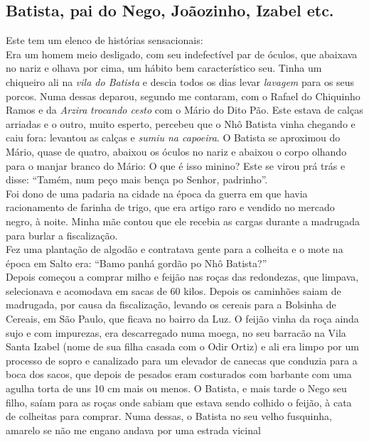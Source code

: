 \documentclass[12pt,brazil,]{book}
\begin{document}
\subsection{Batista, pai do Nego, Joãozinho, Izabel
etc.}\label{batista-pai-do-nego-jouxe3ozinho-izabel-etc.}

Este tem um elenco de histórias sensacionais:\\
Era um homem meio desligado, com seu indefectível par de óculos, que
abaixava no nariz e olhava por cima, um hábito bem característico seu.
Tinha um chiqueiro ali na \emph{vila do Batista} e descia todos os dias
levar \emph{lavagem} para os seus porcos. Numa dessas deparou, segundo
me contaram, com o Rafael do Chiquinho Ramos e da \emph{Arzira}
\emph{trocando cesto} com o Mário do Dito Pão. Este estava de calças
arriadas e o outro, muito esperto, percebeu que o Nhô Batista vinha
chegando e caiu fora: levantou as calças e \emph{sumiu na capoeira}. O
Batista se aproximou do Mário, quase de quatro, abaixou os óculos no
nariz e abaixou o corpo olhando para o manjar branco do Mário: O que é
isso minino? Este se virou prá trás e disse: ``Tamém, num peço mais
bença po Senhor, padrinho''.\\
Foi dono de uma padaria na cidade na época da guerra em que havia
racionamento de farinha de trigo, que era artigo raro e vendido no
mercado negro, à noite. Minha mãe contou que ele recebia as cargas
durante a madrugada para burlar a fiscalização.\\
Fez uma plantação de algodão e contratava gente para a colheita e o mote
na época em Salto era: ``Bamo panhá gordão po Nhô Batista?''\\
Depois começou a comprar milho e feijão nas roças das redondezas, que
limpava, selecionava e acomodava em sacas de 60 kilos. Depois os
caminhões saiam de madrugada, por causa da fiscalização, levando os
cereais para a Bolsinha de Cereais, em São Paulo, que ficava no bairro
da Luz. O feijão vinha da roça ainda sujo e com impurezas, era
descarregado numa moega, no seu barracão na Vila Santa Izabel (nome de
sua filha casada com o Odir Ortiz) e ali era limpo por um processo de
sopro e canalizado para um elevador de canecas que conduzia para a boca
dos sacos, que depois de pesados eram costurados com barbante com uma
agulha torta de uns 10 cm mais ou menos. O Batista, e mais tarde o Nego
seu filho, saíam para as roças onde sabiam que estava sendo colhido o
feijão, à cata de colheitas para comprar. Numa dessas, o Batista no seu
velho fusquinha, amarelo se não me engano andava por uma estrada vicinal
\end{document}
